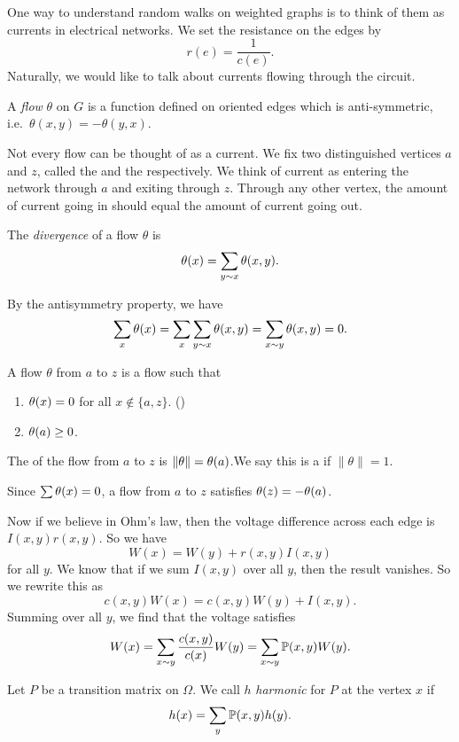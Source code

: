 \documentclass[a4paper]{article}
\let\div\relax
\DeclareMathOperator\div{div}
\begin{document}
One way to understand random walks on weighted graphs is to think of them as currents in electrical networks. We set the resistance on the edges by
\[
  r(e) = \frac{1}{c(e)}.
\]
Naturally, we would like to talk about currents flowing through the circuit.
\begin{defi}[Flow]
  A \emph{flow} $\theta$ on $G$ is a function defined on oriented edges which is anti-symmetric, i.e.\ $\theta(x, y) = - \theta(y, x)$.
\end{defi}
Not every flow can be thought of as a current. We fix two distinguished vertices $a$ and $z$, called the  and the  respectively. We think of current as entering the network through $a$ and exiting through $z$. Through any other vertex, the amount of current going in should equal the amount of current going out.

\begin{defi}[Divergence]
  The \emph{divergence} of a flow $\theta$ is
  \[
    \div \theta (x) = \sum_{y \sim x} \theta(x, y).
  \]
\end{defi}
By the antisymmetry property, we have
\[
  \sum_x \div \theta(x) = \sum_x \sum_{y \sim x} \theta(x, y) = \sum_{x \sim y} \theta(x, y) = 0.
\]
\begin{defi}
  A flow $\theta$ from $a$ to $z$ is a flow such that
  \begin{enumerate}
    \item $\div \theta(x) = 0$ for all $x \not \in \{a, z\}$. \hfill ()
    \item $\div \theta(a) \geq 0$.
  \end{enumerate}
  The  of the flow from $a$ to $z$ is $\|\theta\| = \div \theta(a)$.\index{$\|\theta\|$}We say this is a  if $\|\theta\| = 1$.
\end{defi}
Since $\sum \div \theta(x) = 0$, a flow from $a$ to $z$ satisfies $\div \theta(z) = - \div \theta(a)$.

Now if we believe in Ohm's law, then the voltage difference across each edge is $I(x, y) r(x, y)$. So we have
\[
  W(x) = W(y) + r(x, y) I(x, y)
\]
for all $y$. We know that if we sum $I(x, y)$ over all $y$, then the result vanishes. So we rewrite this as
\[
  c(x, y) W(x) = c(x, y) W(y) + I(x, y).
\]
Summing over all $y$, we find that the voltage satisfies
\[
  W(x) = \sum_{x \sim y} \frac{c(x, y)}{c(x)} W(y) = \sum_{x \sim y} \P(x, y) W(y).
\]
\begin{defi}
  Let $P$ be a transition matrix on $\Omega$. We call $h$ \emph{harmonic} for $P$ at the vertex $x$ if
  \[
    h(x) = \sum_y \P(x, y) h(y).
  \]
\end{defi}
\end{document}
